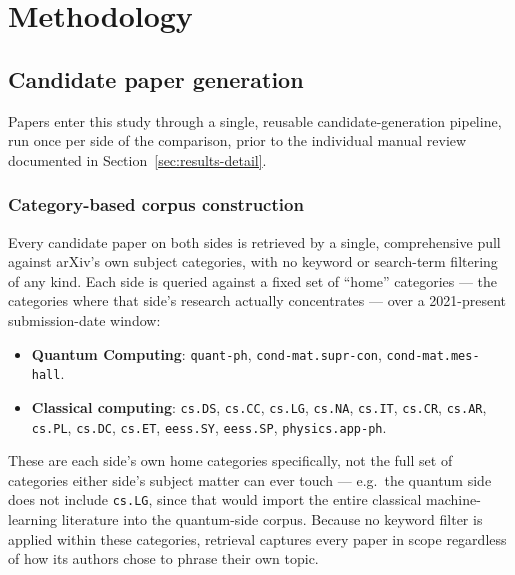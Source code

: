 \section{Methodology}

\subsection{Candidate paper generation}
\label{sec:candidate-generation}

Papers enter this study through a single, reusable candidate-generation pipeline, run
once per side of the comparison, prior to the individual manual review documented in
Section~\ref{sec:results-detail}.

\subsubsection{Category-based corpus construction}
\label{sec:category-corpus-construction}

Every candidate paper on both sides is retrieved by a single, comprehensive pull
against arXiv's own subject categories, with no keyword or search-term filtering of
any kind. Each side is queried against a fixed set of ``home'' categories --- the
categories where that side's research actually concentrates --- over a 2021-present
submission-date window:

\begin{itemize}[leftmargin=1.5em]
    \item \textbf{Quantum Computing}: \texttt{quant-ph}, \texttt{cond-mat.supr-con},
    \texttt{cond-mat.mes-hall}.
    \item \textbf{Classical computing}: \texttt{cs.DS}, \texttt{cs.CC},
    \texttt{cs.LG}, \texttt{cs.NA}, \texttt{cs.IT}, \texttt{cs.CR}, \texttt{cs.AR},
    \texttt{cs.PL}, \texttt{cs.DC}, \texttt{cs.ET}, \texttt{eess.SY},
    \texttt{eess.SP}, \texttt{physics.app-ph}.
\end{itemize}

These are each side's own home categories specifically, not the full set of
categories either side's subject matter can ever touch --- e.g.\ the quantum side
does not include \texttt{cs.LG}, since that would import the entire classical
machine-learning literature into the quantum-side corpus. Because no keyword filter
is applied within these categories, retrieval captures every paper in scope
regardless of how its authors chose to phrase their own topic.

